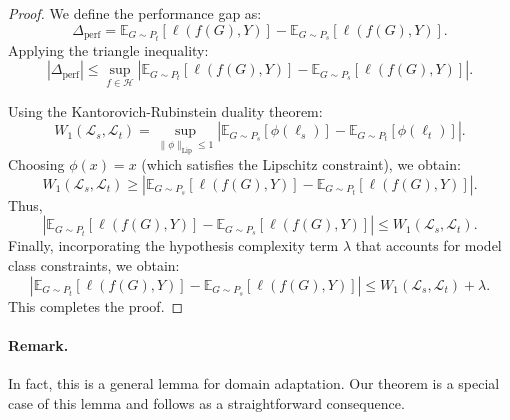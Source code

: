 \begin{proof}
We define the performance gap as:
\begin{equation}
    \Delta_{\text{perf}} = \mathbb{E}_{G \sim P_t} [\ell(f(G), Y)] - \mathbb{E}_{G \sim P_s} [\ell(f(G), Y)].
\end{equation}
Applying the triangle inequality:
\begin{equation}
    |\Delta_{\text{perf}}| \leq \sup_{f \in \mathcal{H}} \left| \mathbb{E}_{G \sim P_t} [\ell(f(G), Y)] - \mathbb{E}_{G \sim P_s} [\ell(f(G), Y)] \right|.
\end{equation}

Using the Kantorovich-Rubinstein duality theorem:
\begin{equation}
    W_1(\mathcal{L}_s, \mathcal{L}_t) = \sup_{\|\phi\|_{\text{Lip}} \leq 1} \left| \mathbb{E}_{G \sim P_s} [\phi(\ell_s)] - \mathbb{E}_{G \sim P_t} [\phi(\ell_t)] \right|.
\end{equation}
Choosing $\phi(x) = x$ (which satisfies the Lipschitz constraint), we obtain:
\begin{equation}
    W_1(\mathcal{L}_s, \mathcal{L}_t) \geq \left| \mathbb{E}_{G \sim P_s} [\ell(f(G), Y)] - \mathbb{E}_{G \sim P_t} [\ell(f(G), Y)] \right|.
\end{equation}
Thus,
\begin{equation}
    \left| \mathbb{E}_{G \sim P_t} [\ell(f(G), Y)] - \mathbb{E}_{G \sim P_s} [\ell(f(G), Y)] \right| \leq W_1(\mathcal{L}_s, \mathcal{L}_t).
\end{equation}
Finally, incorporating the hypothesis complexity term $\lambda$ that accounts for model class constraints, we obtain:
\begin{equation}
    \left| \mathbb{E}_{G \sim P_t} [\ell(f(G), Y)] - \mathbb{E}_{G \sim P_s} [\ell(f(G), Y)] \right| \leq W_1(\mathcal{L}_s, \mathcal{L}_t) + \lambda.
\end{equation}
This completes the proof.
\end{proof}
\paragraph{Remark.}  
In fact, this is a general lemma for domain adaptation. Our theorem is a special case of this lemma and follows as a straightforward consequence.  
